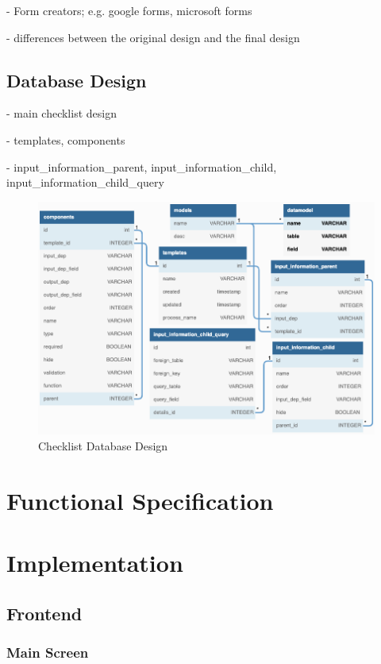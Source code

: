 - Form creators; e.g. google forms, microsoft forms

- differences between the original design and the final design

\subsection{Database Design}
- main checklist design

- templates, components

- input\_information\_parent, input\_information\_child, input\_information\_child\_query

\begin{figure}[ht]
    \centering
    \includegraphics[width=\textwidth]{overleaf/images/checklist_db_design.png}
    \caption{Checklist Database Design}
    \label{fig:checklist_db_design}
\end{figure}

\section{Functional Specification}


\section{Implementation}
\subsection{Frontend}

\subsubsection{Main Screen}

